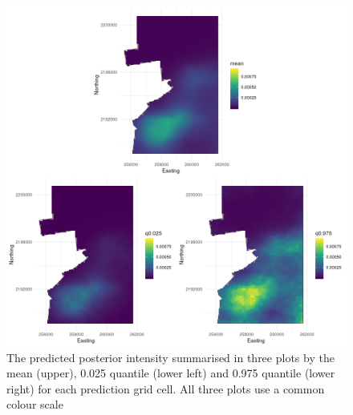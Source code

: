 \documentclass[preprint,12pt]{elsarticle}
\begin{document}
\begin{figure}[h]
	\includegraphics[scale=0.5]{figures/intensity_quantiles.png}
	\caption{The predicted posterior intensity summarised in three plots by the mean (upper),  0.025 quantile (lower left) and 0.975 quantile (lower right) for each prediction grid cell.  All three plots use a common colour scale}
	\label{fig:intensity-quantiles}
\end{figure}
\end{document}
